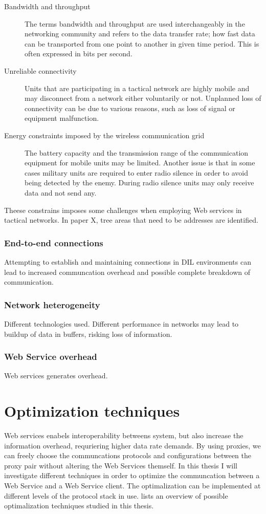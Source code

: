 \documentclass[USenglish]{article}
\begin{document}
\begin{description}
\item[Bandwidth and throughput] The terms bandwidth and throughput are used interchangeably in the networking community and refers to the data transfer rate; how fast data can be transported from one point to another in given time period. This is often expressed in bits per second.
\item[Unreliable connectivity] Units that are participating in a tactical network are highly mobile and may disconnect from a network either voluntarily or not. Unplanned loss of connectivity can be due to various reasons, such as loss of signal or equipment malfunction.
\item[Energy constraints imposed by the wireless communication grid] The battery capacity and the transmission range of the communication equipment for mobile units may be limited. Another issue is that in some cases military units are required to enter radio silence in order to avoid being detected by the enemy. During radio silence units may only receive data and not send any.
\end{description}

Theese constrains imposes some challenges when employing Web services in tactical networks. In paper X, tree areas that need to be addresses are identified\cite{IST-118}.

\label{section:DIL-problems}
\subsubsection{End-to-end connections}
Attempting to establish and maintaining connections in DIL environments can lead to increased communcation overhead and possible complete breakdown of communication.
\subsubsection{Network heterogeneity}
Different technologies used. Different performance in networks may lead to buildup of data in buffers, risking loss of information.
\subsubsection{Web Service overhead}
Web services generates overhead.
\section{Optimization techniques}
Web services enabels interoperability betweens system, but also increase the information overhead, requriering higher data rate demands. By using proxies, we can freely choose the communcations protocols and configurations between the proxy pair without altering the Web Services themself. In this thesis I will investigate different techniques in order to optimize the communcation between a Web Service and a Web Service client. The optimalization can be implemented at different levels of the protocol stack in use.  lists an overview of possible optimalization techniques studied in this thesis.
\\ \\
\end{document}
